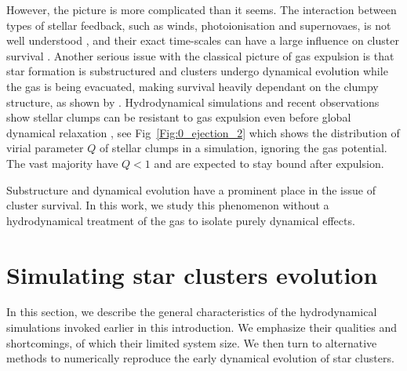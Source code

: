 
However, the picture is more complicated than it seems. The interaction between types of stellar feedback, such as winds, photoionisation and supernovaes, is not well understood \citep{Dale2011,Dale2013}, and their exact time-scales can have a large influence on cluster survival \citep{Pelupessy2012}. Another serious issue with the classical picture of gas expulsion is that star formation is substructured and clusters undergo dynamical evolution while the gas is being evacuated, making survival heavily dependant on the clumpy structure, as shown by \cite{Farias2015}. Hydrodynamical simulations and recent observations show stellar clumps can be resistant to gas expulsion even before global dynamical relaxation \citep{Kruijssen2012,Kuhn2015b}, see Fig~\ref{Fig:0_ejection_2} which shows the distribution of virial parameter $Q$ of stellar clumps in a simulation, ignoring the gas potential. The vast majority have $Q<1$ and are expected to stay bound after expulsion.


Substructure and dynamical evolution have a prominent place in the issue of cluster survival. In this work, we study this phenomenon without a hydrodynamical treatment of the gas to isolate purely dynamical effects.



\section{Simulating star clusters evolution}

In this section, we describe the general characteristics of the hydrodynamical simulations invoked
earlier in this introduction. We emphasize their qualities and shortcomings, of which their limited system size. We then turn to alternative methods to numerically reproduce the early dynamical evolution of star clusters.

